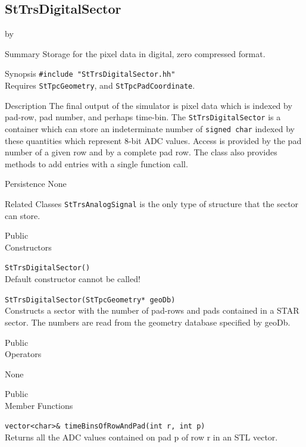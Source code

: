 \documentclass[twoside]{article}
\newcommand{\comp}[1]{\texttt{#1}}%
\newcommand{\entrylabel}[1]{\mbox{\textbf{{#1}}}\hfil}%
\newenvironment{entry}
{\begin{list}{}%
    {\renewcommand{\makelabel}{\entrylabel}%
     \setlength{\labelwidth}{90pt}%
     \setlength{\leftmargin}{\labelwidth}
     \advance\leftmargin by \labelsep%
      }%
    }%
  {\end{list}}
\newcommand{\Entrylabel}[1]%
{\raisebox{0pt}[1ex][0pt]{\makebox[\labelwidth][l]%
    {\parbox[t]{\labelwidth}{\hspace{0pt}\textbf{{#1}}}}}}
\newenvironment{Entry}%
{\renewcommand{\entrylabel}{\Entrylabel}\begin{entry}}%
  {\end{entry}}
\begin{document}
\subsection{StTrsDigitalSector} 
\label{sec:stTrsDigitalSector}

\begin{Entry}
\item[Summary]
  Storage for the pixel data in digital, zero compressed format.


\item[Synopsis]
  \verb+#include "StTrsDigitalSector.hh"+\\
  Requires \comp{StTpcGeometry}, and
  \comp{StTpcPadCoordinate}.

\item[Description]
  The final output of the simulator is pixel data which is indexed
  by pad-row, pad number, and perhaps time-bin.
  The \comp{StTrsDigitalSector} is
  a container which can store an indeterminate number of \texttt{signed char}
  indexed by these quantities which represent 8-bit ADC values.
  Access is provided by the pad number of
  a given row and by a complete pad row.  The class also provides methods to
  add entries with a single function call.

\item[Persistence]
   None

\item[Related Classes]
  \comp{StTrsAnalogSignal} is the only type of structure that the
  sector can store.

\item[Public \\ Constructors]

  \verb+StTrsDigitalSector()+\\
  Default constructor cannot be called!

  \verb+StTrsDigitalSector(StTpcGeometry* geoDb)+\\
  Constructs a sector with the number of pad-rows and pads contained
  in a STAR sector.  The numbers are read from the geometry database
  specified by geoDb.

\item[Public \\ Operators]

  None

\item[Public \\ Member Functions]

  \verb+vector<char>& timeBinsOfRowAndPad(int r, int p)+\\
  Returns all the ADC values contained on pad p of row r in
  an STL vector.


\end{Entry}
\end{document}
